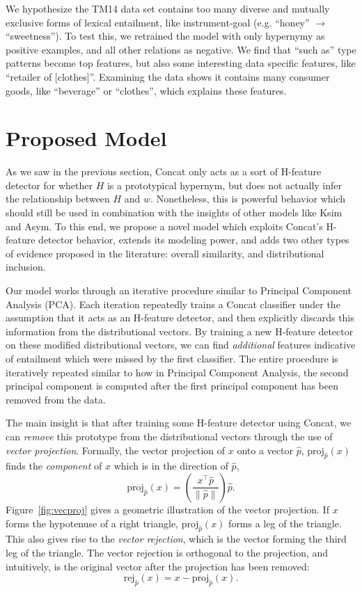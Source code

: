 We hypothesize the TM14 data set contains too many diverse
and mutually exclusive forms of lexical entailment, like
instrument-goal (e.g. ``honey'' $\rightarrow$ ``sweetness'').
To test this, we retrained the model with only hypernymy as positive examples, and
all other relations as negative.  We find that ``such as'' type patterns become top features,
but also some interesting data specific features, like ``retailer of [clothes]''.
Examining the data shows it contains many consumer goods, like
``beverage'' or ``clothes'', which explains these features.



\section{Proposed Model}

As we saw in the previous section, Concat only acts as a sort of H-feature
detector for whether $H$ is a prototypical hypernym, but does not actually
infer the relationship between $H$ and $w$. Nonetheless, this is powerful
behavior which should still be used in combination with the insights of other
models like Ksim and Asym. To this end, we propose a novel model which exploits
Concat's H-feature detector behavior, extends its modeling power, and adds two
other types of evidence proposed in the literature: overall similarity, and
distributional inclusion.

Our model works through an iterative procedure similar to Principal Component
Analysis (PCA). Each iteration repeatedly trains a Concat classifier under the
assumption that it acts as an H-feature detector, and then explicitly discards
this information from the distributional vectors. By training a new
H-feature detector on these modified distributional vectors, we can find {\em additional}
features indicative of entailment which were missed by the first classifier.
The entire procedure is iteratively repeated similar to how in Principal
Component Analysis, the second principal component is computed after the first
principal component has been removed from the data.

The main insight is that after training some H-feature detector using Concat,
we can {\em remove} this prototype from the distributional vectors through
the use of {\em vector projection}.
Formally, the vector projection of $x$ onto
a vector $\hat p$, $\text{proj}_{\hat p}(x)$ finds the {\em component} of $x$
which is in the direction of $\hat p$,
\begin{equation*}
  \text{proj}_{\hat p}(x) = \left(\frac{x^{\top}\hat p}{\|\hat p\|}\right)\hat p.
\end{equation*}
Figure~\ref{fig:vecproj} gives a geometric illustration of the vector
projection. If $x$ forms the hypotenuse of a right
triangle, $\text{proj}_{\hat p}(x)$ forms a leg of the triangle. This also
gives rise to the {\em vector rejection}, which is the vector forming the third
leg of the triangle. The vector rejection is orthogonal to the projection, and
intuitively, is the original vector after the projection has been removed:
\begin{equation*}
  \text{rej}_{\hat p}(x) = x - \text{proj}_{\hat p}(x).
\end{equation*}

